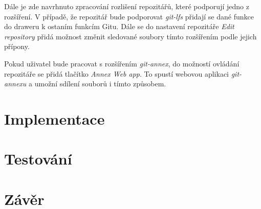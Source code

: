     Dále je zde navrhnuto zpracování rozlišení repozitářů, které podporují jedno z rozšíření. V případě, že repozitář bude podporovat \emph{git-lfs} přidají se dané funkce do draweru k ostaním funkcím Gitu. Dále se do nastavení repozitáře \emph{Edit repository} přidá možnost změnit sledované soubory tímto rozšířením podle jejich přípony.

    Pokud uživatel bude pracovat s rozšířením \emph{git-annex}, do možností ovládání repozitáře se přidá tlačítko \emph{Annex Web app}. To spustí webovou aplikaci \emph{git-annexu} a umožní sdílení souborů i tímto způsobem.
\chapter{Implementace}
\chapter{Testování}
\chapter{Závěr}